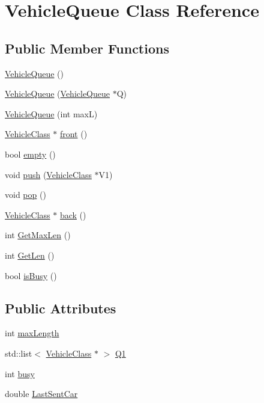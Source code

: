 \hypertarget{class_vehicle_queue}{\section{Vehicle\-Queue Class Reference}
\label{class_vehicle_queue}
}
\subsection*{Public Member Functions}
\begin{DoxyCompactItemize}
\item 
\hyperlink{class_vehicle_queue_a19f80d40ffe612dae9b2cbce39fe1a1a}{Vehicle\-Queue} ()
\item 
\hyperlink{class_vehicle_queue_a84393b3dc29273e9fc18ff6c498c4a95}{Vehicle\-Queue} (\hyperlink{class_vehicle_queue}{Vehicle\-Queue} $\ast$Q)
\item 
\hyperlink{class_vehicle_queue_a3e939caee1688630bf1f9ba50ef0d67e}{Vehicle\-Queue} (int max\-L)
\item 
\hyperlink{class_vehicle_class}{Vehicle\-Class} $\ast$ \hyperlink{class_vehicle_queue_aff7fef0dc6401e38a26bc34ee0e78f2a}{front} ()
\item 
bool \hyperlink{class_vehicle_queue_a9c22a63f1c7562bc14be172a38cffcb9}{empty} ()
\item 
void \hyperlink{class_vehicle_queue_a71dfef194e7e2cbfdca2b724d66301b8}{push} (\hyperlink{class_vehicle_class}{Vehicle\-Class} $\ast$V1)
\item 
void \hyperlink{class_vehicle_queue_ad4f16ccf1a5990172e28b7782051b50a}{pop} ()
\item 
\hyperlink{class_vehicle_class}{Vehicle\-Class} $\ast$ \hyperlink{class_vehicle_queue_a302883b18a07a99dacd614ee5332f09e}{back} ()
\item 
int \hyperlink{class_vehicle_queue_a4d5dc7f4ee55be52e781b252e6260ba1}{Get\-Max\-Len} ()
\item 
int \hyperlink{class_vehicle_queue_ae443ecfa4227dbb5094f1bd33e77abb0}{Get\-Len} ()
\item 
bool \hyperlink{class_vehicle_queue_ada2e9158033c24433b042ab46abe2fb8}{is\-Busy} ()
\end{DoxyCompactItemize}
\subsection*{Public Attributes}
\begin{DoxyCompactItemize}
\item 
int \hyperlink{class_vehicle_queue_a8634f859977fc6937f91abc302d56318}{max\-Length}
\item 
std\-::list$<$ \hyperlink{class_vehicle_class}{Vehicle\-Class} $\ast$ $>$ \hyperlink{class_vehicle_queue_aabc389fa6c347740a30453aced66009c}{Q1}
\item 
int \hyperlink{class_vehicle_queue_a4ce16496b3665d0b91a8b5baf158c3a3}{busy}
\item 
double \hyperlink{class_vehicle_queue_a329310055fa8fd635fd6740a8400b88d}{Last\-Sent\-Car}
\end{DoxyCompactItemize}


